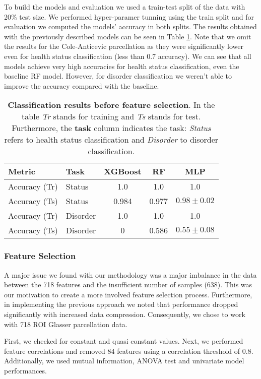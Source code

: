 \documentclass[fleqn,moreauthors,10pt]{ds_report}
\begin{document}
To build the models and evaluation we used a train-test split of the data with 20\% test size. We performed hyper-paramer tunning using the train split and for evaluation we computed the models' accuracy in both splits. The results obtained with the previously described models can be seen in Table \ref{tab:glassier_classification}. Note that we omit the results for the Cole-Anticevic parcellation as they were significantly lower even for health status classification (less than 0.7 accuracy).  We can see that all models achieve very high accuracies for health status classification, even the baseline RF model. However, for disorder classification we weren't able to improve the accuracy compared with the baseline.

\begin{table}[h!]
\centering
\begin{tabular}{|l|l| c|c|c|}
\hline
\textbf{Metric} & \textbf{Task} & \textbf{XGBoost} & \textbf{RF}& \textbf{MLP} \\ \hline
Accuracy (Tr) & Status & 1.0 & 1.0 & 1.0  \\ \hline
Accuracy (Ts) & Status & 0.984 & 0.977 & $0.98 \pm 0.02$ \\ \hline
Accuracy (Tr) & Disorder & 1.0 & 1.0 & 1.0 \\ \hline
Accuracy (Ts) & Disorder & 0 & 0.586 & $0.55 \pm 0.08$ \\ \hline
\end{tabular}
\caption{\textbf{Classification results before feature selection}. In the table \textit{Tr} stands for training and \textit{Ts} stands for test. Furthermore, the \textbf{task} column indicates the task: \textit{Status} refers to health status classification and \textit{Disorder} to disorder classification.}
\label{tab:glassier_classification}
\end{table}

\subsubsection*{Feature Selection}
 A major issue we found with our methodology was a major imbalance in the data between the 718 features and the insufficient number of samples (638). This was our motivation to create a more involved feature selection process. Furthermore, in  implementing the previous approach we noted that performance dropped significantly with increased data compression. Consequently, we chose to work with 718 ROI Glasser parcellation data. 

First, we checked for constant and quasi constant values. Next, we performed feature correlations and removed 84 features using a correlation threshold of 0.8. Additionally, we used mutual information, ANOVA test and univariate model performances.
\end{document}
